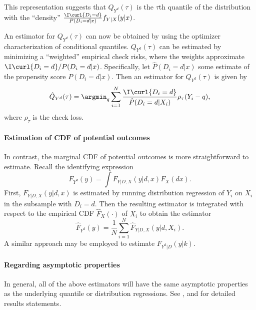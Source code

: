  This representation suggests that $Q_{Y^d}(\tau)$ is the $\tau$th quantile of the distribution with the ``density'' $\frac{\I\curl{D_i=d} }{P\left(D_i=d|x\right)}f_{Y|X}(y| x)$. 
 
 An estimator for $Q_{Y^d}(\tau)$ can now be obtained by using the optimizer characterization of conditional quantiles.    $Q_{Y^d}(\tau)$ can be estimated by minimizing a ``weighted'' empirical check risks, where the weights approximate $\I\curl{D_i=d}/P(D_i=d|x)$. Specifically, let $\hat{P}(D_i=d|x)$ some estimate of the propensity score $P(D_i=d|x)$. Then an estimator for $Q_{Y^d}(\tau)$ is given by 
 \begin{equation}
 \hat{Q}_{Y^d}(\tau) = \argmin_{q}   \sum_{i=1}^N  \dfrac{\I\curl{D_i=d}}{\hat{P}(D_i=d|X_i) } \rho_{\tau} (Y_i-q),
 \end{equation}
 where $\rho_{\tau}$ is the check loss.
 
 
 \paragraph{Estimation of CDF of potential outcomes}
  
  In contrast, the marginal CDF of potential outcomes is more straightforward to estimate. Recall the identifying expression
  \begin{equation}
	F_{Y^d}(y) = \int F_{Y|D, X}(y|d, x)F_X(dx).  	 
  \end{equation}
  First,  $F_{Y|D, X}(y|d, x)$ is estimated by running distribution regression of $Y_i$ on $X_i$ in the subsample with $D_i=d$. Then the resulting estimator is integrated with respect to the empirical CDF $\hat{F}_X(\cdot)$ of $X_i$ to obtain the estimator
  \begin{equation}
  	 \hat{F}_{Y^d}(y) = \dfrac{1}{N} \sum_{i=1}^N  \hat{F}_{Y|D, X}(y|d, X_i).
  \end{equation}
  A similar approach may be employed to estimate $F_{Y^d|D}(y|k)$. 
  
  
 
  
 \paragraph{Regarding asymptotic properties}
 
 In general, all of the above estimators will have the same asymptotic properties as the underlying quantile or distribution regressions. See    \cite{Angrist2006QuantileRegressionMisspecification, Chernozhukov2013b}, and \cite{Firpo2007EfficientSemiparametricEstimation} for detailed results statements. 
 
